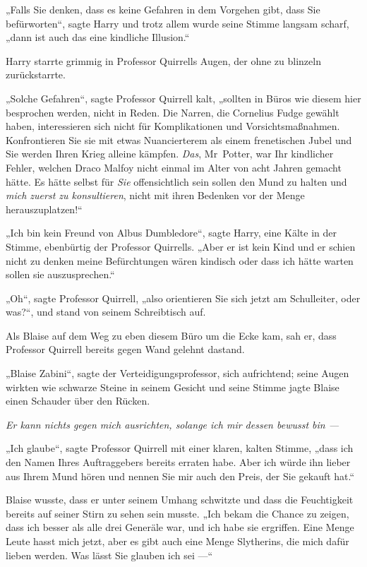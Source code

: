 {„Falls Sie denken, dass es keine Gefahren in dem Vorgehen gibt, dass Sie befürworten“, sagte Harry und trotz allem wurde seine Stimme langsam scharf, „dann ist auch das eine kindliche Illusion.“

Harry starrte grimmig in Professor Quirrells Augen, der ohne zu blinzeln zurückstarrte.

„Solche Gefahren“, sagte Professor Quirrell kalt, „sollten in Büros wie diesem hier besprochen werden, nicht in Reden. Die Narren, die Cornelius Fudge gewählt haben, interessieren sich nicht für Komplikationen und Vorsichtsmaßnahmen. Konfrontieren Sie sie mit etwas Nuancierterem als einem frenetischen Jubel und Sie werden Ihren Krieg alleine kämpfen. \emph{Das}, Mr~Potter, war Ihr kindlicher Fehler, welchen Draco Malfoy nicht einmal im Alter von acht Jahren gemacht hätte. Es hätte selbst für \emph{Sie} offensichtlich sein sollen den Mund zu halten und \emph{mich zuerst zu konsultieren}, nicht mit ihren Bedenken vor der Menge herauszuplatzen!“

„Ich bin kein Freund von Albus Dumbledore“, sagte Harry, eine Kälte in der Stimme, ebenbürtig der Professor Quirrells. „Aber er ist kein Kind und er schien nicht zu denken meine Befürchtungen wären kindisch oder dass ich hätte warten sollen sie auszusprechen.“

„Oh“, sagte Professor Quirrell, „also orientieren Sie sich jetzt am Schulleiter, oder was?“, und stand von seinem Schreibtisch auf.

Als Blaise auf dem Weg zu eben diesem Büro um die Ecke kam, sah er, dass Professor Quirrell bereits gegen Wand gelehnt dastand.

„Blaise Zabini“, sagte der Verteidigungsprofessor, sich aufrichtend; seine Augen wirkten wie schwarze Steine in seinem Gesicht und seine Stimme jagte Blaise einen Schauder über den Rücken.

\emph{Er kann nichts gegen mich ausrichten, solange ich mir dessen bewusst bin —}

„Ich glaube“, sagte Professor Quirrell mit einer klaren, kalten Stimme, „dass ich den Namen Ihres Auftraggebers bereits erraten habe. Aber ich würde ihn lieber aus Ihrem Mund hören und nennen Sie mir auch den Preis, der Sie gekauft hat.“

Blaise wusste, dass er unter seinem Umhang schwitzte und dass die Feuchtigkeit bereits auf seiner Stirn zu sehen sein musste. „Ich bekam die Chance zu zeigen, dass ich besser als alle drei Generäle war, und ich habe sie ergriffen. Eine Menge Leute hasst mich jetzt, aber es gibt auch eine Menge Slytherins, die mich dafür lieben werden. Was lässt Sie glauben ich sei —“

}

